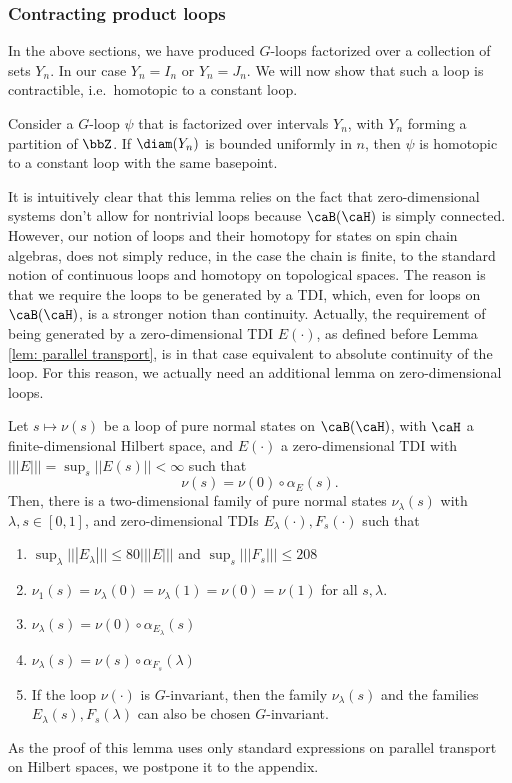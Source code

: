 \subsubsection{Contracting product loops}

In the above sections, we have produced $G$-loops factorized over a collection of sets $Y_n$. In our case $Y_n=I_n$ or $Y_n=J_n$.
We will now show that such a loop is contractible, i.e.\ homotopic to a constant loop.  
\begin{lemma}\label{lem: contractibility of product loop}
	Consider a $G$-loop $\psi$ that is factorized over intervals $Y_n$, with $Y_n$ forming a partition of $\bbZ$. If $\diam(Y_n)$ is bounded uniformly in $n$, then $\psi$ is homotopic to a constant loop with the same basepoint. 
\end{lemma}
It is intuitively clear that this lemma relies on the fact that zero-dimensional systems don't allow for nontrivial loops because $\caB(\caH)$ is simply connected.  However, our notion of loops and their homotopy for states on spin chain algebras, does not simply reduce, in the case the chain is finite, to the standard notion of continuous loops and homotopy on topological spaces.  The reason is that we require the loops to be generated by a TDI, which, even for loops on $\caB(\caH)$, is a stronger notion than continuity. Actually, the requirement of being generated by a zero-dimensional TDI  $E(\cdot)$, as defined before Lemma \ref{lem: parallel transport}, is in that case equivalent to absolute continuity of the loop. 
For this reason, we actually need an additional lemma on zero-dimensional loops.
\begin{lemma}\label{lem: contractibility zero dim} Let $s\mapsto\nu(s)$ be a loop of pure normal states on $\caB(\caH)$, with $\caH$ a finite-dimensional Hilbert space, 
	and  $E(\cdot)$ a zero-dimensional TDI with $ |||E|||= \sup_s||E(s)|| <\infty$ such that 
	$$ \nu(s)=  \nu(0) \circ  \alpha_E(s).$$
	Then, there is a two-dimensional family of pure normal states $\nu_{\lambda}(s)$ with $\lambda, s \in [0,1]$, and zero-dimensional TDIs $E_\lambda(\cdot),F_s(\cdot)$ such that 
	\begin{enumerate}
		\item $\sup_\lambda|||E_\lambda||| \leq  80|||E||| $ and  $\sup_s |||F_s||| \leq  208 $
		\item $\nu_1(s)=\nu_{\lambda}(0)=\nu_{\lambda}(1)=\nu(0)=\nu(1)$ for all $s,\lambda$. 
		\item  $\nu_{\lambda}(s) =  \nu(0) \circ  \alpha_{E_\lambda}(s)  $
		\item  $\nu_{\lambda}(s)  = \nu(s) \circ  \alpha_{F_s}(\lambda)   $
		\item If the loop $\nu(\cdot)$ is $G$-invariant, then the family $\nu_\lambda(s)$ and the families $E_\lambda(s),F_s(\lambda)$ can also be chosen $G$-invariant. 
	\end{enumerate}
\end{lemma}
As the proof of this lemma uses only standard expressions on parallel transport on Hilbert spaces, we postpone it to the appendix.



